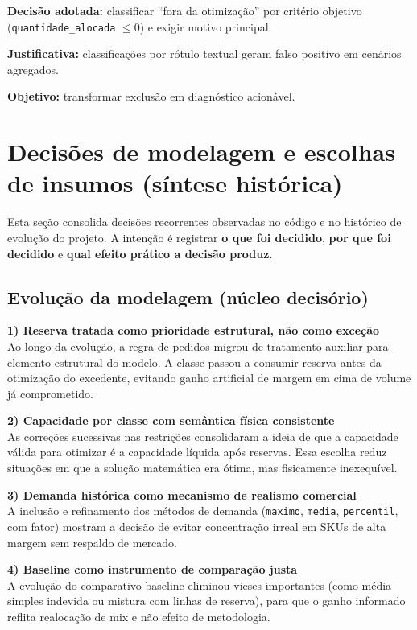\documentclass[11pt,a4paper]{article}
\begin{document}
\textbf{Decisão adotada:} classificar ``fora da otimização'' por critério objetivo
(\texttt{quantidade\_alocada} \(\le 0\)) e exigir motivo principal.

\textbf{Justificativa:} classificações por rótulo textual geram falso positivo em
cenários agregados.

\textbf{Objetivo:} transformar exclusão em diagnóstico acionável.

\section{Decisões de modelagem e escolhas de insumos (síntese histórica)}

Esta seção consolida decisões recorrentes observadas no código e no histórico de
evolução do projeto. A intenção é registrar \textbf{o que foi decidido},
\textbf{por que foi decidido} e \textbf{qual efeito prático a decisão produz}.

\subsection{Evolução da modelagem (núcleo decisório)}

\textbf{1) Reserva tratada como prioridade estrutural, não como exceção}\\
Ao longo da evolução, a regra de pedidos migrou de tratamento auxiliar para
elemento estrutural do modelo. A classe passou a consumir reserva antes da
otimização do excedente, evitando ganho artificial de margem em cima de volume
já comprometido.

\textbf{2) Capacidade por classe com semântica física consistente}\\
As correções sucessivas nas restrições consolidaram a ideia de que a capacidade
válida para otimizar é a capacidade líquida após reservas. Essa escolha reduz
situações em que a solução matemática era ótima, mas fisicamente inexequível.

\textbf{3) Demanda histórica como mecanismo de realismo comercial}\\
A inclusão e refinamento dos métodos de demanda (\texttt{maximo}, \texttt{media},
\texttt{percentil}, com fator) mostram a decisão de evitar concentração irreal em
SKUs de alta margem sem respaldo de mercado.

\textbf{4) Baseline como instrumento de comparação justa}\\
A evolução do comparativo baseline eliminou vieses importantes (como média simples
indevida ou mistura com linhas de reserva), para que o ganho informado reflita
realocação de mix e não efeito de metodologia.
\end{document}
